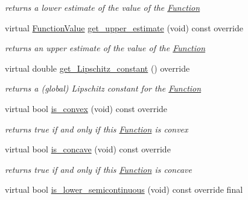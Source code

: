 \begin{Indent}
\begin{DoxyCompactItemize}
\begin{DoxyCompactList}\small\item\em returns a lower estimate of the value of the \mbox{\hyperlink{class_s_m_spp__di__unipi__it_1_1_function}{Function}} \end{DoxyCompactList}\item 
virtual \mbox{\hyperlink{class_s_m_spp__di__unipi__it_1_1_function_a9ad432406b609e28d340f73e9474bffe}{Function\+Value}} \mbox{\hyperlink{class_s_m_spp__di__unipi__it_1_1_d_quad_function_ae2ab9abc3617f25a7c526c457362864f}{get\+\_\+upper\+\_\+estimate}} (void) const override
\begin{DoxyCompactList}\small\item\em returns an upper estimate of the value of the \mbox{\hyperlink{class_s_m_spp__di__unipi__it_1_1_function}{Function}} \end{DoxyCompactList}\item 
virtual double \mbox{\hyperlink{class_s_m_spp__di__unipi__it_1_1_d_quad_function_a228a1eed4901ac03c7a51da94a9bc923}{get\+\_\+\+Lipschitz\+\_\+constant}} () override
\begin{DoxyCompactList}\small\item\em returns a (global) Lipschitz constant for the \mbox{\hyperlink{class_s_m_spp__di__unipi__it_1_1_function}{Function}} \end{DoxyCompactList}\item 
virtual bool \mbox{\hyperlink{class_s_m_spp__di__unipi__it_1_1_d_quad_function_a20a6d803edcf5c8ae8b702b8a010af54}{is\+\_\+convex}} (void) const override
\begin{DoxyCompactList}\small\item\em returns true if and only if this \mbox{\hyperlink{class_s_m_spp__di__unipi__it_1_1_function}{Function}} is convex \end{DoxyCompactList}\item 
virtual bool \mbox{\hyperlink{class_s_m_spp__di__unipi__it_1_1_d_quad_function_abdb6d9788add66498dda476d9f5f1ff7}{is\+\_\+concave}} (void) const override
\begin{DoxyCompactList}\small\item\em returns true if and only if this \mbox{\hyperlink{class_s_m_spp__di__unipi__it_1_1_function}{Function}} is concave \end{DoxyCompactList}\item 
virtual bool \mbox{\hyperlink{class_s_m_spp__di__unipi__it_1_1_d_quad_function_a4999c961244a6547170ef8f1c786cfa5}{is\+\_\+lower\+\_\+semicontinuous}} (void) const override final

\end{DoxyCompactItemize}
\end{Indent}
